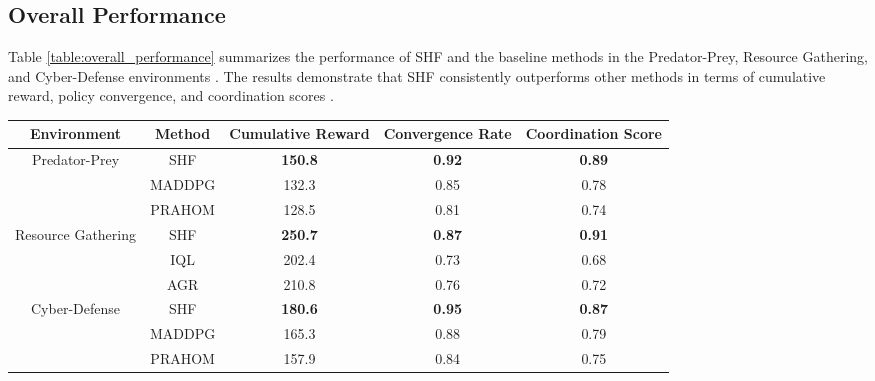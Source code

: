 \documentclass[sigconf,anonymous]{aamas}
\begin{document}

\subsection{Overall Performance}
Table \ref{table:overall_performance} summarizes the performance of SHF and the baseline methods in the Predator-Prey, Resource Gathering, and Cyber-Defense environments \cite{foerster2016learning}. The results demonstrate that SHF consistently outperforms other methods in terms of cumulative reward, policy convergence, and coordination scores \cite{foerster2018counterfactual}.

\begin{table*}[ht]
\centering
\caption{Performance comparison of SHF and baseline methods across different environments.}
\label{table:overall_performance}
\begin{tabular}{|c|c|c|c|c|}
\hline
\textbf{Environment} & \textbf{Method} & \textbf{Cumulative Reward} & \textbf{Convergence Rate} & \textbf{Coordination Score} \\ \hline
\multirow{3}{*}{Predator-Prey} & SHF & \textbf{150.8} & \textbf{0.92} & \textbf{0.89} \\ \cline{2-5} 
                               & MADDPG & 132.3 & 0.85 & 0.78 \\ \cline{2-5} 
                               & PRAHOM & 128.5 & 0.81 & 0.74 \\ \hline
\multirow{3}{*}{Resource Gathering} & SHF & \textbf{250.7} & \textbf{0.87} & \textbf{0.91} \\ \cline{2-5} 
                                    & IQL & 202.4 & 0.73 & 0.68 \\ \cline{2-5} 
                                    & AGR & 210.8 & 0.76 & 0.72 \\ \hline
\multirow{3}{*}{Cyber-Defense} & SHF & \textbf{180.6} & \textbf{0.95} & \textbf{0.87} \\ \cline{2-5} 
                               & MADDPG & 165.3 & 0.88 & 0.79 \\ \cline{2-5} 
                               & PRAHOM & 157.9 & 0.84 & 0.75 \\ \hline
\end{tabular}
\end{table*}

\end{document}
